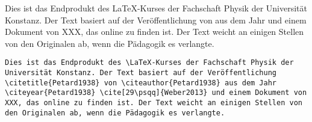 \begin{frame}[fragile]
	\Losung
	\begin{outputbox}
		Dies ist das Endprodukt des \LaTeX-Kurses der Fachschaft Physik der Universität Konstanz. Der Text basiert auf der Veröffentlichung  von \citeauthor{Petard1938} aus dem Jahr \citeyear{Petard1938} \cite[29\psqq]{Weber2013} und einem Dokument von XXX, das online zu finden ist. Der Text weicht an einigen Stellen von den Originalen ab, wenn die Pädagogik es verlangte.
	\end{outputbox}

	\Code
	\begin{lstlisting}
Dies ist das Endprodukt des \LaTeX-Kurses der Fachschaft Physik der Universität Konstanz. Der Text basiert auf der Veröffentlichung \citetitle{Petard1938} von \citeauthor{Petard1938} aus dem Jahr \citeyear{Petard1938} \cite[29\psqq]{Weber2013} und einem Dokument von XXX, das online zu finden ist. Der Text weicht an einigen Stellen von den Originalen ab, wenn die Pädagogik es verlangte.	
	\end{lstlisting}
\end{frame}